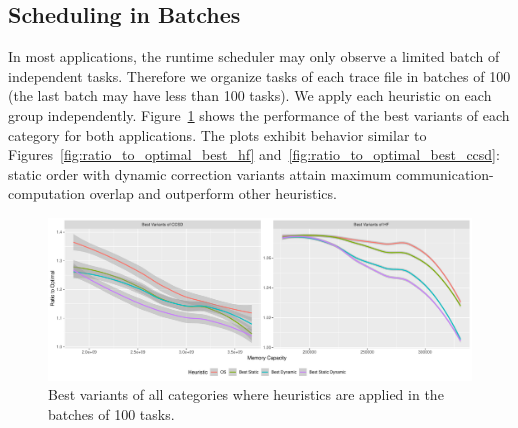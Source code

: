 \documentclass[sigconf]{acmart}
\begin{document}
{		\subsection{Scheduling in Batches}
		In most applications, the runtime scheduler may only observe a limited batch of independent tasks. Therefore we organize tasks of each trace file in batches of 100 (the last batch may have less than 100 tasks). We apply each heuristic on each group independently. Figure~\ref{fig:best_variants_batch} shows the performance of the best variants of each category for both applications. The plots exhibit behavior similar to Figures~\ref{fig:ratio_to_optimal_best_hf} and~\ref{fig:ratio_to_optimal_best_ccsd}: static order with dynamic correction variants attain maximum communication-computation overlap and outperform other heuristics.
		
		
		
		\begin{figure}[htb]
			\includegraphics[scale=0.5]{./results/plots/ratio_to_optimal_batch-best.pdf}
			\caption{Best variants of all categories where heuristics are applied in the batches of 100 tasks.}
			\label{fig:best_variants_batch}
		\end{figure}
		
}
\end{document}

